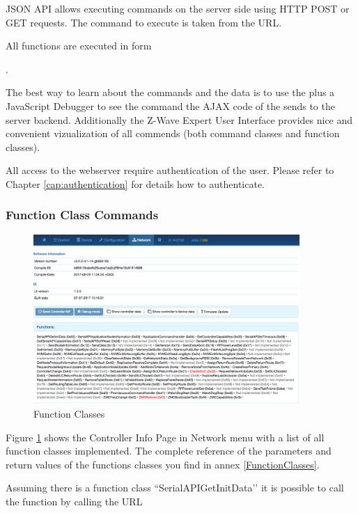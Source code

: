 JSON API allows executing commands on the server side using HTTP POST or GET requests. 
The command to execute is taken from the URL.

All functions are executed in form


.

The best way to learn about the commands and the data is to use the \zweui plus 
a JavaScript Debugger to see the command the AJAX code of the \zweui sends to the 
\zway server backend. Additionally the Z-Wave Expert User Interface provides nice and 
convenient vizualization of all commends (both command classes and function classes).

All access to the webserver require authentication of the user. Please refer to Chapter
\ref{cap:authentication} for details how to authenticate.

\subsubsection{Function Class Commands}


\begin{figure}
\begin{center}
\includegraphics[width=0.9\textwidth]{pngs/cap11/dev3.png}
\caption{\zway Function Classes}
\label{dev3}
\end{center}
\end{figure}

Figure \ref{dev3} shows the Controller Info Page in Network menu with a list of all 
function classes implemented. The complete reference of the parameters and return 
values of the functions classes you find in annex \ref{FunctionClasses}.

Assuming there is a function class ``SerialAPIGetInitData’’ it is possible to call 
the function by calling the URL

